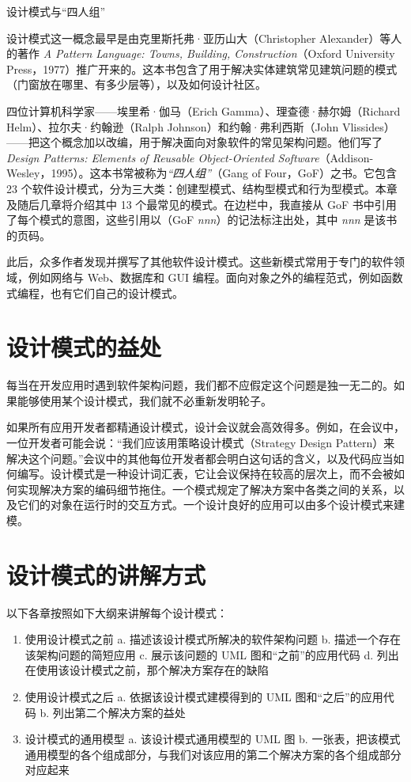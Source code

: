 \begin{mySidebar}{设计模式与“四人组”}

设计模式这一概念最早是由克里斯托弗·亚历山大（Christopher Alexander）等人的著作 \emph{A Pattern Language: Towns, Building, Construction}（Oxford University Press，1977）推广开来的。这本书包含了用于解决实体建筑常见建筑问题的模式（门窗放在哪里、有多少层等），以及如何设计社区。

四位计算机科学家——埃里希·伽马（Erich Gamma）、理查德·赫尔姆（Richard Helm）、拉尔夫·约翰逊（Ralph Johnson）和约翰·弗利西斯（John Vlissides）——把这个概念加以改编，用于解决面向对象软件的常见架构问题。他们写了 \emph{Design Patterns: Elements of Reusable Object-Oriented Software}（Addison-Wesley，1995）。这本书常被称为\emph{“四人组”}（Gang of Four，GoF）之书。它包含 23 个软件设计模式，分为三大类：创建型模式、结构型模式和行为型模式。本章及随后几章将介绍其中 13 个最常见的模式。在边栏中，我直接从 GoF 书中引用了每个模式的意图，这些引用以（GoF \emph{nnn}）的记法标注出处，其中 \emph{nnn} 是该书的页码。

此后，众多作者发现并撰写了其他软件设计模式。这些新模式常用于专门的软件领域，例如网络与 Web、数据库和 GUI 编程。面向对象之外的编程范式，例如函数式编程，也有它们自己的设计模式。
\end{mySidebar}

\section*{设计模式的益处}

每当在开发应用时遇到软件架构问题，我们都不应假定这个问题是独一无二的。如果能够使用某个设计模式，我们就不必重新发明轮子。

如果所有应用开发者都精通设计模式，设计会议就会高效得多。例如，在会议中，一位开发者可能会说：“我们应该用策略设计模式（Strategy Design Pattern）来解决这个问题。”会议中的其他每位开发者都会明白这句话的含义，以及代码应当如何编写。设计模式是一种设计词汇表，它让会议保持在较高的层次上，而不会被如何实现解决方案的编码细节拖住。一个模式规定了解决方案中各类之间的关系，以及它们的对象在运行时的交互方式。一个设计良好的应用可以由多个设计模式来建模。

\section*{设计模式的讲解方式}

以下各章按照如下大纲来讲解每个设计模式：

\begin{enumerate}
\item 使用设计模式之前 a. 描述该设计模式所解决的软件架构问题 b. 描述一个存在该架构问题的简短应用 c. 展示该问题的 UML 图和“之前”的应用代码 d. 列出在使用该设计模式之前，那个解决方案存在的缺陷
\item 使用设计模式之后 a. 依据该设计模式建模得到的 UML 图和“之后”的应用代码 b. 列出第二个解决方案的益处
\item 设计模式的通用模型 a. 该设计模式通用模型的 UML 图 b. 一张表，把该模式通用模型的各个组成部分，与我们对该应用的第二个解决方案的各个组成部分对应起来
\end{enumerate}

